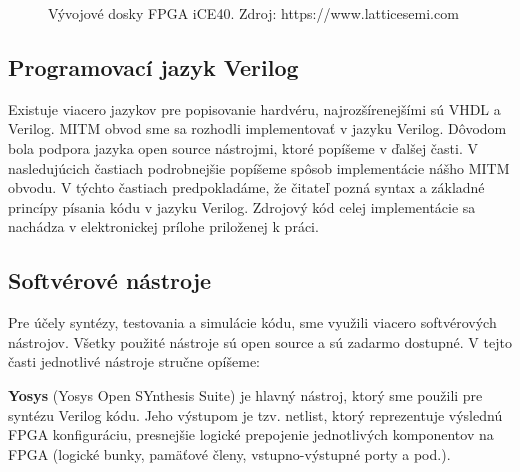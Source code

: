 \begin{figure}
    \centering
    \hfill
    \caption[Vývojové dosky FPGA iCE40]{Vývojové dosky FPGA iCE40. Zdroj: https://www.latticesemi.com}
    \label{obr:iceHw}
\end{figure}

\subsection{Programovací jazyk Verilog}
Existuje viacero jazykov pre popisovanie hardvéru, najrozšírenejšími sú VHDL a Verilog. MITM obvod sme sa rozhodli implementovať v jazyku Verilog. Dôvodom bola podpora jazyka open source nástrojmi, ktoré popíšeme v ďalšej časti. V nasledujúcich častiach podrobnejšie popíšeme spôsob implementácie nášho MITM obvodu. V týchto častiach predpokladáme, že čitateľ pozná syntax a základné princípy písania kódu v jazyku Verilog. Zdrojový kód celej implementácie sa nachádza v elektronickej prílohe priloženej k práci.

\subsection{Softvérové nástroje}\label{subsek:software}
Pre účely syntézy, testovania a simulácie kódu, sme využili viacero softvérových nástrojov. Všetky použité nástroje sú open source a sú zadarmo dostupné. V tejto časti jednotlivé nástroje stručne opíšeme:

\textbf{Yosys} (Yosys Open SYnthesis Suite) \cite{yosys} je hlavný nástroj, ktorý sme použili pre syntézu Verilog kódu. Jeho výstupom je tzv. netlist, ktorý reprezentuje výslednú FPGA konfiguráciu, presnejšie logické prepojenie jednotlivých komponentov na FPGA (logické bunky, pamäťové členy, vstupno-výstupné porty a pod.).

